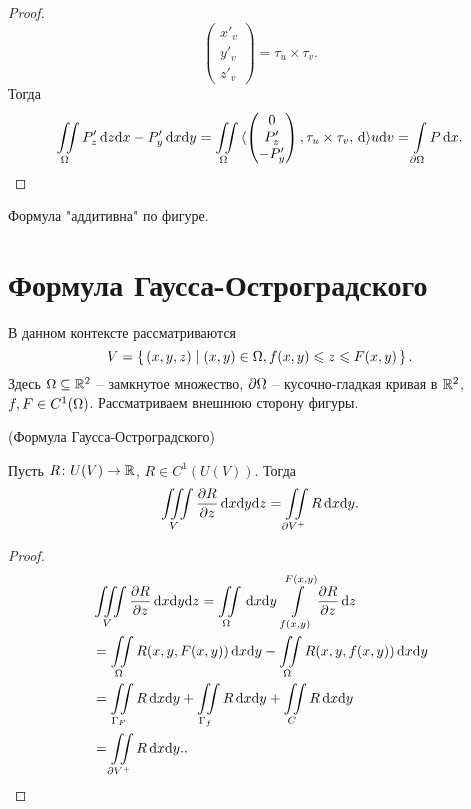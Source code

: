 \begin{proof}
\[\begin{pmatrix}
            x'_v \\ y'_v \\ z'_v
        \end{pmatrix} = \tau_u \times \tau_v
    .\]
    Тогда
    \[
        \iint\limits_\Omega{P'_z \,\mathrm{d}z \mathrm{d}x - P'_y \,\mathrm{d}x \mathrm{d}y} = \iint\limits_\Omega{\langle 
        \begin{pmatrix}
            0 \\ P'_z \\ -P'_y
        \end{pmatrix}, \tau_u \times \tau_v, \,\mathrm{d}\rangle u \mathrm{d}v} =
        \int\limits_{\partial \Omega}{P \,\mathrm{d} x}
    .\]
\end{proof}

\begin{remark}
    Формула "аддитивна" по фигуре.
\end{remark}

\section{Формула Гаусса-Остроградского}

\begin{remark}
    В данном контексте рассматриваются
\[
    V = \left\{\, (x, y, z) \mid (x, y) \in \Omega, f(x, y) \leqslant z \leqslant F(x, y) \,\right\}
.\] 
    Здесь $\Omega \subseteq \mathbb{R}^2$ -- замкнутое множество, $\partial \Omega$ -- кусочно-гладкая кривая
    в $\mathbb{R}^2$, $f, F \in C^1(\Omega)$. Рассматриваем внешнюю сторону фигуры.
\end{remark}

\begin{theorem}(Формула Гаусса-Остроградского)

    Пусть $R \colon U(V) \to \mathbb{R}$, $R \in C^1(U(V))$. Тогда
\[
    \iiint\limits_{V}{\dfrac{\partial R}{\partial z} \,\mathrm{d} x \mathrm{d} y \mathrm{d} z} = \iint\limits_{\partial V^+}{R \,\mathrm{d} x \mathrm{d} y}
.\] 
\end{theorem}
\begin{proof}
    \begin{align*}
        &\iiint\limits_{V}{\dfrac{\partial R}{\partial z} \,\mathrm{d} x \mathrm{d} y \mathrm{d} z} = \iint\limits_{\Omega}{\,\mathrm{d} x \mathrm{d} y~
        {\int\limits_{f(x, y)}^{F(x, y)}{\dfrac{\partial R}{\partial z} \,\mathrm{d} z}}} \\
        &= \iint\limits_{\Omega}{R(x, y, F(x, y)) \,\mathrm{d} x \mathrm{d} y} - \iint\limits_{\Omega}{R(x, y, f(x, y)) \,\mathrm{d} x \mathrm{d} y} \\
        &= \iint\limits_{\Gamma_F}{R \,\mathrm{d} x \mathrm{d} y} + \iint\limits_{\Gamma_f}{R \,\mathrm{d} x \mathrm{d} y} + \iint\limits_{C}{R \,\mathrm{d} x \mathrm{d} y} \\
        &= \iint\limits_{\partial V^+}{R \,\mathrm{d} x \mathrm{d} y}
    ..\end{align*}
\end{proof}

